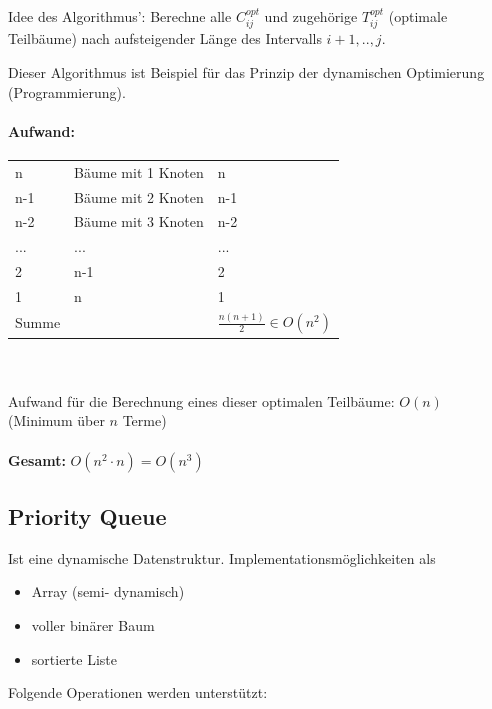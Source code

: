 \documentclass[fleqn]{scrartcl}
\begin{document}
Idee des Algorithmus': Berechne alle $C_{ij}^{opt}$ und zugehörige $T_{ij}^{opt}$ (optimale Teilbäume) nach aufsteigender Länge des Intervalls $i+1, .., j$.

Dieser Algorithmus ist Beispiel für das Prinzip der dynamischen Optimierung (Programmierung).

\paragraph{Aufwand:}
\begin{tabular} {l l l}
n & Bäume mit 1 Knoten & n\\
n-1 & Bäume mit 2 Knoten & n-1\\
n-2 & Bäume mit 3 Knoten & n-2\\
... & ... & ...\\
2 & n-1 & 2\\
1 & n & 1\\
\hline
Summe & & $\frac{n(n+1)}{2} \in O(n^2)$
\end{tabular}\\\\
Aufwand für die Berechnung eines dieser optimalen Teilbäume: $O(n)$ (Minimum über $n$ Terme)\\\\
\textbf{Gesamt:} $O(n^2 \cdot n) = O (n^3)$


\newpage\subsection{Priority Queue}
Ist eine dynamische Datenstruktur. Implementationsmöglichkeiten als
\begin{itemize}
\item Array (semi- dynamisch)
\item voller binärer Baum
\item sortierte Liste
\end{itemize}

Folgende Operationen werden unterstützt:
\end{document}
